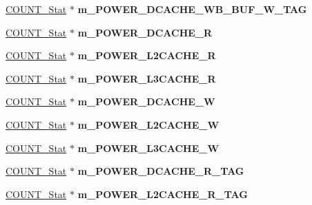 \begin{DoxyCompactItemize}
\item 
\hypertarget{classall__stats__c_ac46ad374181c973c999949fc0a9ba410}{
\hyperlink{classCOUNT__Stat}{COUNT\_\-Stat} $\ast$ {\bfseries m\_\-POWER\_\-DCACHE\_\-WB\_\-BUF\_\-W\_\-TAG}}
\label{classall__stats__c_ac46ad374181c973c999949fc0a9ba410}

\item 
\hypertarget{classall__stats__c_a1cc65ee39c9228ffff93369180ed7528}{
\hyperlink{classCOUNT__Stat}{COUNT\_\-Stat} $\ast$ {\bfseries m\_\-POWER\_\-DCACHE\_\-R}}
\label{classall__stats__c_a1cc65ee39c9228ffff93369180ed7528}

\item 
\hypertarget{classall__stats__c_ad225a1f402f1b2636b8b5c4ab89a4682}{
\hyperlink{classCOUNT__Stat}{COUNT\_\-Stat} $\ast$ {\bfseries m\_\-POWER\_\-L2CACHE\_\-R}}
\label{classall__stats__c_ad225a1f402f1b2636b8b5c4ab89a4682}

\item 
\hypertarget{classall__stats__c_a63b1be73e751b534a28498c584a45c3a}{
\hyperlink{classCOUNT__Stat}{COUNT\_\-Stat} $\ast$ {\bfseries m\_\-POWER\_\-L3CACHE\_\-R}}
\label{classall__stats__c_a63b1be73e751b534a28498c584a45c3a}

\item 
\hypertarget{classall__stats__c_a130e5e9827d9de13e3f1f09d98ffb815}{
\hyperlink{classCOUNT__Stat}{COUNT\_\-Stat} $\ast$ {\bfseries m\_\-POWER\_\-DCACHE\_\-W}}
\label{classall__stats__c_a130e5e9827d9de13e3f1f09d98ffb815}

\item 
\hypertarget{classall__stats__c_a5b590f9b733c02f7061d92ac8253715f}{
\hyperlink{classCOUNT__Stat}{COUNT\_\-Stat} $\ast$ {\bfseries m\_\-POWER\_\-L2CACHE\_\-W}}
\label{classall__stats__c_a5b590f9b733c02f7061d92ac8253715f}

\item 
\hypertarget{classall__stats__c_a8ab1b158137227d73e56117a035e4baa}{
\hyperlink{classCOUNT__Stat}{COUNT\_\-Stat} $\ast$ {\bfseries m\_\-POWER\_\-L3CACHE\_\-W}}
\label{classall__stats__c_a8ab1b158137227d73e56117a035e4baa}

\item 
\hypertarget{classall__stats__c_a6ea750aef871fb618ea85e361e438f50}{
\hyperlink{classCOUNT__Stat}{COUNT\_\-Stat} $\ast$ {\bfseries m\_\-POWER\_\-DCACHE\_\-R\_\-TAG}}
\label{classall__stats__c_a6ea750aef871fb618ea85e361e438f50}

\item 
\hypertarget{classall__stats__c_a1358ff4746aff5007499eab50af89362}{
\hyperlink{classCOUNT__Stat}{COUNT\_\-Stat} $\ast$ {\bfseries m\_\-POWER\_\-L2CACHE\_\-R\_\-TAG}}
\label{classall__stats__c_a1358ff4746aff5007499eab50af89362}


\end{DoxyCompactItemize}
